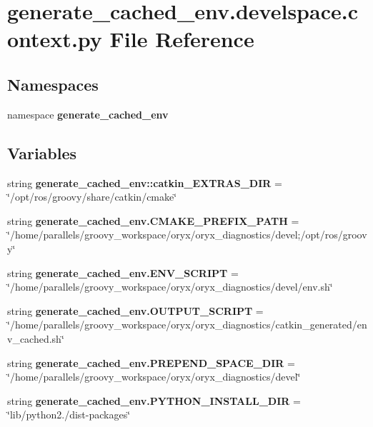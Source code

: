 \section{generate\-\_\-cached\-\_\-env.\-develspace.\-context.\-py \-File \-Reference}
\label{generate__cached__env_8develspace_8context_8py}
\subsection*{\-Namespaces}
\begin{DoxyCompactItemize}
\item 
namespace {\bf generate\-\_\-cached\-\_\-env}
\end{DoxyCompactItemize}
\subsection*{\-Variables}
\begin{DoxyCompactItemize}
\item 
string {\bf generate\-\_\-cached\-\_\-env\-::catkin\-\_\-\-E\-X\-T\-R\-A\-S\-\_\-\-D\-I\-R} = \char`\"{}/opt/ros/groovy/share/catkin/cmake\char`\"{}
\item 
string {\bf generate\-\_\-cached\-\_\-env.\-C\-M\-A\-K\-E\-\_\-\-P\-R\-E\-F\-I\-X\-\_\-\-P\-A\-T\-H} = \char`\"{}/home/parallels/groovy\-\_\-workspace/oryx/oryx\-\_\-diagnostics/devel;/opt/ros/groovy\char`\"{}
\item 
string {\bf generate\-\_\-cached\-\_\-env.\-E\-N\-V\-\_\-\-S\-C\-R\-I\-P\-T} = \char`\"{}/home/parallels/groovy\-\_\-workspace/oryx/oryx\-\_\-diagnostics/devel/env.\-sh\char`\"{}
\item 
string {\bf generate\-\_\-cached\-\_\-env.\-O\-U\-T\-P\-U\-T\-\_\-\-S\-C\-R\-I\-P\-T} = \char`\"{}/home/parallels/groovy\-\_\-workspace/oryx/oryx\-\_\-diagnostics/catkin\-\_\-generated/env\-\_\-cached.\-sh\char`\"{}
\item 
string {\bf generate\-\_\-cached\-\_\-env.\-P\-R\-E\-P\-E\-N\-D\-\_\-\-S\-P\-A\-C\-E\-\_\-\-D\-I\-R} = \char`\"{}/home/parallels/groovy\-\_\-workspace/oryx/oryx\-\_\-diagnostics/devel\char`\"{}
\item 
string {\bf generate\-\_\-cached\-\_\-env.\-P\-Y\-T\-H\-O\-N\-\_\-\-I\-N\-S\-T\-A\-L\-L\-\_\-\-D\-I\-R} = \char`\"{}lib/python2./dist-\/packages\char`\"{}
\end{DoxyCompactItemize}
